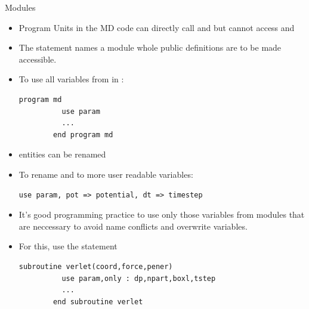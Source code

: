 \documentclass[10pt,t]{beamer}
\begin{document}
\begin{frame}{Modules}
\begin{itemize}
\begin{lstlisting}[language={[90]Fortran},basicstyle=\fontsize{5}{6}\selectfont\ttfamily,mathescape]
contains
  $\cdots$
end module potential
      \end{lstlisting}
    \item Program Units in the MD code can directly call  and  but cannot access  and 
    \end{itemize}
  \framebreak
    \begin{itemize}
      \item The  statement names a module whole public definitions are to be made accessible.
      \item[] To use all variables from  in :
        \begin{lstlisting}[language={[90]Fortran},basicstyle=\fontsize{5}{6}\selectfont\ttfamily,mathescape]
        program md
          use param
          ...
        end program md
        \end{lstlisting}
      \item {} entities can be renamed
      \item[] To rename  and  to more user readable variables:
        \begin{lstlisting}[language={[90]Fortran},basicstyle=\fontsize{5}{6}\selectfont\ttfamily,mathescape]
        use param, pot => potential, dt => timestep
        \end{lstlisting}
      \item It's good programming practice to use only those variables from modules that are neccessary to avoid name conflicts and overwrite variables.
      \item For this, use the  statement
        \begin{lstlisting}[language={[90]Fortran},basicstyle=\fontsize{5}{6}\selectfont\ttfamily,mathescape]
        subroutine verlet(coord,force,pener)
          use param,only : dp,npart,boxl,tstep
          ...
        end subroutine verlet
            \end{lstlisting}
    \end{itemize}
\end{frame}
\end{document}
